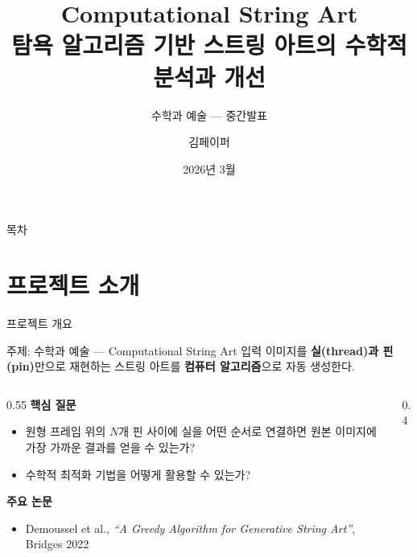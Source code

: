 \documentclass[10pt,aspectratio=169]{beamer}
\title[Computational String Art]{%
  \textbf{Computational String Art}\\[4pt]
  탐욕 알고리즘 기반 스트링 아트의 수학적 분석과 개선}
\subtitle{수학과 예술 — 중간발표}
\author{김페이퍼}
\institute{한국과학영재학교}
\date{2026년 3월}
\begin{document}
\begin{frame}
  \titlepage
\end{frame}

\begin{frame}{목차}
  \tableofcontents
\end{frame}


\section{프로젝트 소개}

\begin{frame}{프로젝트 개요}
  \begin{block}{주제: 수학과 예술 — Computational String Art}
    입력 이미지를 \textbf{실(thread)과 핀(pin)}만으로 재현하는
    스트링 아트를 \textbf{컴퓨터 알고리즘}으로 자동 생성한다.
  \end{block}

  \vspace{0.3cm}
  \begin{columns}[T]
    \begin{column}{0.55\textwidth}
      \textbf{핵심 질문}
      \begin{itemize}
        \item 원형 프레임 위의 $N$개 핀 사이에 실을 어떤 순서로 연결하면
              원본 이미지에 가장 가까운 결과를 얻을 수 있는가?
        \item 수학적 최적화 기법을 어떻게 활용할 수 있는가?
      \end{itemize}

      \vspace{0.3cm}
      \textbf{주요 논문}
      \begin{itemize}
        \item Demoussel et al., \textit{``A Greedy Algorithm for Generative String Art''}, Bridges 2022
      \end{itemize}
    \end{column}
    \begin{column}{0.4\textwidth}
    \end{column}
  \end{columns}
\end{frame}
\end{document}

